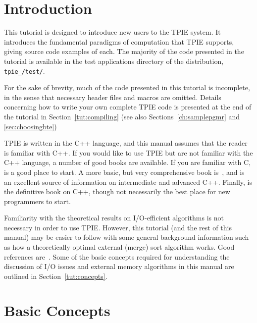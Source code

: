 \section{Introduction}

This tutorial is designed to introduce new users to the TPIE system.
It introduces the fundamental paradigms of computation that TPIE
supports, giving source code examples of each.  The majority of the
code presented in the tutorial is available in the test
applications directory of the distribution, 
{\tt tpie\_\version/test/}.

For the sake of brevity, much of the code presented in this tutorial is
incomplete, in the sense that necessary header files 
and macros are omitted. Details concerning how to write your
own complete TPIE code is presented at the end of the tutorial in
Section~\ref{tut:compiling} (see also Sections~\ref{ch:samplepgmr} and
\ref{sec:choosingbte})

TPIE is written in the C++ language, and this manual assumes
that the reader is familiar with C++.  If you would like to
use TPIE but are not familiar with the C++
language, a number of good books are available. If you are
familiar with C, \cite{pohl:c++} is a good place to
start. A more basic, but very comprehensive book
is~\cite{deitel:c++}, and \cite{meyers:effective} is an
excellent source of information on intermediate and advanced
C++.  Finally, \cite{ellis:arm} is the definitive book on
C++, though not necessarily the best place for new
programmers to start.

Familiarity with the theoretical results on I/O-efficient
algorithms is not necessary in order to use TPIE. However,
this tutorial (and the rest of this manual) may be easier to
follow with some general background information such as how
a theoretically optimal external (merge) sort algorithm
works. Good references
are~\cite{vitter:podssurvey,arge:gisbook,aggarwal:input}.
Some of the basic concepts required for understanding the
discussion of I/O issues and external memory algorithms in
this manual are outlined in Section~\ref{tut:concepts}.

\section{Basic Concepts}
   
